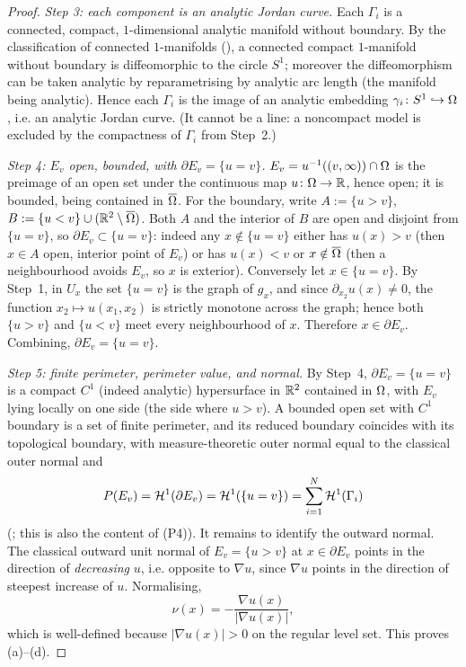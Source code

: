 \begin{proof}
\emph{Step 3: each component is an analytic Jordan curve.}
Each $\Gamma_i$ is a connected, compact, $1$-dimensional analytic manifold
without boundary. By the classification of connected $1$-manifolds
(\cite[Appendix, Classification of $1$-manifolds]{Milnor1997}), a connected
compact $1$-manifold without boundary is diffeomorphic to the circle $S^1$;
moreover the diffeomorphism can be taken analytic by reparametrising by analytic
arc length (the manifold being analytic). Hence each $\Gamma_i$ is the image of
an analytic embedding $\gamma_i\colon S^1\hookrightarrow\Omega$, i.e. an analytic
Jordan curve. (It cannot be a line: a noncompact model is excluded by the
compactness of $\Gamma_i$ from Step~2.)

\emph{Step 4: $E_v$ open, bounded, with $\partial E_v=\{u=v\}$.}
$E_v=u^{-1}((v,\infty))\cap\Omega$ is the preimage of an open set under the
continuous map $u\colon\Omega\to\mathbb{R}$, hence open; it is bounded, being contained in
$\overline{\Omega}$. For the boundary, write $A:=\{u>v\}$, $B:=\{u<v\}\cup(\mathbb{R}^2\setminus\overline{\Omega})$.
Both $A$ and the interior of $B$ are open and disjoint from $\{u=v\}$, so
$\partial E_v\subset\{u=v\}$: indeed any $x\notin\{u=v\}$ either has $u(x)>v$
(then $x\in A$ open, interior point of $E_v$) or has $u(x)<v$ or $x\notin\overline{\Omega}$
(then a neighbourhood avoids $E_v$, so $x$ is exterior). Conversely let
$x\in\{u=v\}$. By Step~1, in $U_x$ the set $\{u=v\}$ is the graph of $g_x$, and
since $\partial_{x_2}u(x)\ne0$, the function $x_2\mapsto u(x_1,x_2)$ is strictly
monotone across the graph; hence both $\{u>v\}$ and $\{u<v\}$ meet every
neighbourhood of $x$. Therefore $x\in\partial E_v$. Combining,
$\partial E_v=\{u=v\}$.

\emph{Step 5: finite perimeter, perimeter value, and normal.}
By Step~4, $\partial E_v=\{u=v\}$ is a compact $C^1$ (indeed analytic)
hypersurface in $\mathbb{R}^2$ contained in $\Omega$, with $E_v$ lying locally on one side
(the side where $u>v$). A bounded open set with $C^1$ boundary is a set of
finite perimeter, and its reduced boundary coincides with its topological
boundary, with measure-theoretic outer normal equal to the classical outer
normal and
\[
  P(E_v)=\mathcal{H}^1(\partial E_v)=\mathcal{H}^1(\{u=v\})=\sum_{i=1}^N\mathcal{H}^1(\Gamma_i)
\]
(\cite[\S5.7.2, Theorem~1 and \S5.1]{EvansGariepy2015}; this is also the
content of (P4)). It remains to identify the outward normal. The classical
outward unit normal of $E_v=\{u>v\}$ at $x\in\partial E_v$ points in the
direction of \emph{decreasing} $u$, i.e. opposite to $\nabla u$, since $\nabla u$
points in the direction of steepest increase of $u$. Normalising,
\[
  \nu(x)=-\frac{\nabla u(x)}{|\nabla u(x)|},
\]
which is well-defined because $|\nabla u(x)|>0$ on the regular level set. This
proves (a)--(d).
\end{proof}

